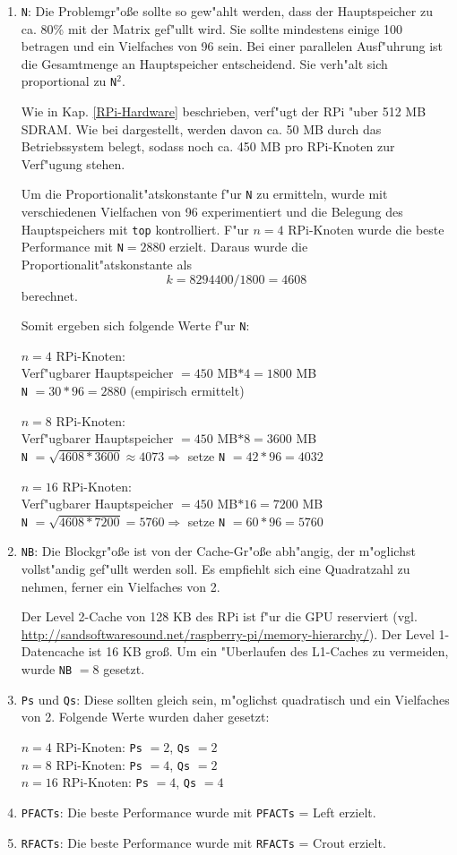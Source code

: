 \begin{enumerate} 
	\item \texttt{N}: Die Problemgr"o\ss e sollte so gew"ahlt werden, dass der Hauptspeicher zu ca. 80\% mit der Matrix gef"ullt wird. Sie sollte mindestens einige 100 betragen und ein Vielfaches von 96 sein. Bei einer parallelen Ausf"uhrung ist die Gesamtmenge an Hauptspeicher entscheidend. Sie verh"alt sich proportional zu \texttt{N}$^2$. 
	
Wie in Kap. \ref{RPi-Hardware} beschrieben, verf"ugt der RPi "uber 512 MB SDRAM. Wie bei \cite{kli13} dargestellt, werden davon ca. 50 MB durch das Betriebssystem belegt, sodass noch ca. 450 MB pro RPi-Knoten zur Verf"ugung stehen. 

Um die Proportionalit"atskonstante f"ur \texttt{N} zu ermitteln, wurde mit verschiedenen Vielfachen von 96 experimentiert und die Belegung des Hauptspeichers mit \texttt{top} kontrolliert. F"ur $n=4$ RPi-Knoten wurde die beste Performance mit \texttt{N}$=2880$ erzielt. Daraus wurde die Proportionalit"atskonstante als \[k=8294400/1800=4608\] berechnet. 

Somit ergeben sich folgende Werte f"ur \texttt{N}:

$n=4$ RPi-Knoten:\\
Verf"ugbarer Hauptspeicher $=450$ MB$\ast 4=1800$ MB\\
\texttt{N} $=30\ast 96=2880$ (empirisch ermittelt)

$n=8$ RPi-Knoten:\\
Verf"ugbarer Hauptspeicher $=450$ MB$\ast 8=3600$ MB\\
\texttt{N} $=\sqrt{4608\ast 3600}\approx 4073\Rightarrow$ setze \texttt{N} $=42\ast 96=4032$

$n=16$ RPi-Knoten:\\
Verf"ugbarer Hauptspeicher $=450$ MB$\ast 16=7200$ MB\\
\texttt{N} $=\sqrt{4608\ast 7200}=5760\Rightarrow$ setze \texttt{N} $=60\ast 96=5760$	
	\item \texttt{NB}: Die Blockgr"o\ss e ist von der Cache-Gr"o\ss e abh"angig, der m"oglichst vollst"andig gef"ullt werden soll. Es empfiehlt sich eine Quadratzahl zu nehmen, ferner ein Vielfaches von 2. 

Der Level 2-Cache von 128 KB des RPi ist f"ur die GPU reserviert (vgl. \url{http://sandsoftwaresound.net/raspberry-pi/memory-hierarchy/}). Der Level 1-Daten\-cache ist 16 KB gro\ss. Um ein "Uberlaufen des L1-Caches zu vermeiden, wurde \texttt{NB} $= 8$ gesetzt. 
	\item \texttt{Ps} und \texttt{Qs}: Diese sollten gleich sein, m"oglichst quadratisch und ein Vielfaches von 2. Folgende Werte wurden daher gesetzt: 
	
$n=4$ RPi-Knoten: \texttt{Ps} $=2$, \texttt{Qs} $=2$\\ 
$n=8$ RPi-Knoten: \texttt{Ps} $=4$, \texttt{Qs} $=2$\\ 
$n=16$ RPi-Knoten: \texttt{Ps} $=4$, \texttt{Qs} $=4$
	\item \texttt{PFACTs}: Die beste Performance wurde mit \texttt{PFACTs} = Left erzielt. 
	\item \texttt{RFACTs}: Die beste Performance wurde mit \texttt{RFACTs} = Crout erzielt.
\end{enumerate}
